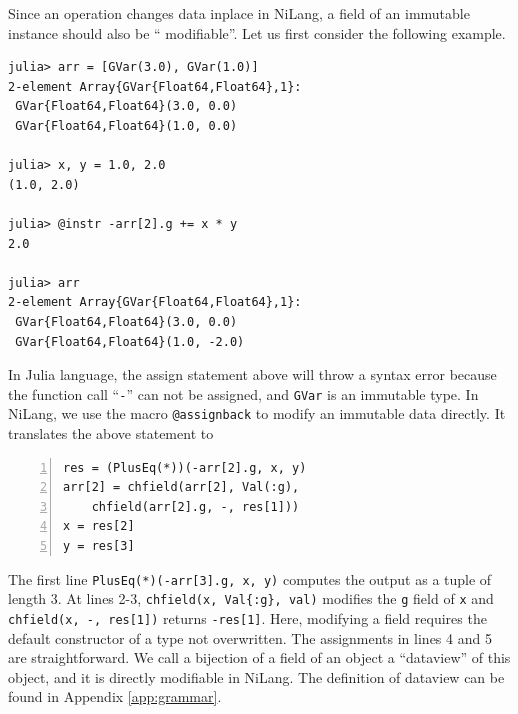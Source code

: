 \documentclass{article}
\newcommand{\<}{\langle}
\renewcommand{\>}{\rangle}
\newcommand{\App}[1]{Appendix \ref{#1}}
\theoremstyle{definition}\newtheorem{definition}{\textit{Definition}}
\begin{document}
Since an operation changes data inplace in NiLang, a field of an immutable instance should also be `` modifiable''.
Let us first consider the following example.

\begin{minipage}{.88\columnwidth}
\begin{lstlisting}
julia> arr = [GVar(3.0), GVar(1.0)]
2-element Array{GVar{Float64,Float64},1}:
 GVar{Float64,Float64}(3.0, 0.0)
 GVar{Float64,Float64}(1.0, 0.0)

julia> x, y = 1.0, 2.0
(1.0, 2.0)

julia> @instr -arr[2].g += x * y
2.0

julia> arr
2-element Array{GVar{Float64,Float64},1}:
 GVar{Float64,Float64}(3.0, 0.0) 
 GVar{Float64,Float64}(1.0, -2.0)
\end{lstlisting}
\end{minipage}

In Julia language, the assign statement above will throw a syntax error because the function call ``\texttt{-}'' can not be assigned, and \texttt{GVar} is an immutable type.
In NiLang, we use the macro \texttt{@assignback} to modify an immutable data directly. It translates the above statement to

\begin{minipage}{.88\columnwidth}
\begin{lstlisting}[numberstyle=\scriptsize\color{gray},numbers=left,numbersep=8pt]
res = (PlusEq(*))(-arr[2].g, x, y)
arr[2] = chfield(arr[2], Val(:g),
    chfield(arr[2].g, -, res[1]))
x = res[2]
y = res[3]
\end{lstlisting}
\end{minipage}

The first line \texttt{PlusEq(*)(-arr[3].g, x, y)} computes the output as a tuple of length $3$.
At lines 2-3, \texttt{chfield(x, Val\{:g\}, val)} modifies the \texttt{g} field of \texttt{x} and \texttt{chfield(x, -, res[1])} returns \texttt{-res[1]}. Here, modifying a field requires the default constructor of a type not overwritten.
The assignments in lines 4 and 5 are straightforward.
We call a bijection of a field of an object a ``dataview'' of this object, and it is directly modifiable in NiLang.
The definition of dataview can be found in \App{app:grammar}.
\end{document}
